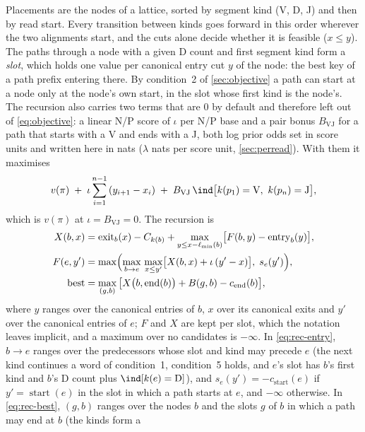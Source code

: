 \documentclass[11pt,a4paper]{article}
\begin{document}
Placements are the nodes of a lattice, sorted by segment kind (V, D, J) and
then by read start. Every transition between kinds goes forward in this
order wherever the two alignments start, and the cuts alone decide whether
it is feasible ($x\le y$). The paths through a node with a given D count and
first segment kind form a \emph{slot}, which holds one value per canonical
entry cut $y$ of the node: the best key of a path prefix entering there. By
condition~2 of \cref{sec:objective} a path can start at a node only at the
node's own start, in the slot whose first kind is the node's. The recursion
also carries two terms that are 0 by default and therefore left out of
\cref{eq:objective}: a linear N/P score of $\iota$ per N/P base and a pair
bonus $B_{\mathrm{VJ}}$ for a path that starts with a V and ends with a J,
both log prior odds set in score units and written here in nats ($\lambda$
nats per score unit, \cref{sec:perread}). With them it maximises
\begin{equation}
  v(\pi) \;+\; \iota\sum_{i=1}^{n-1}\,(y_{i+1}-x_i)
  \;+\; B_{\mathrm{VJ}}\,\ind\bigl[k(p_1)=\mathrm V,\ k(p_n)=\mathrm J\bigr],
  \label{eq:objective-ext}
\end{equation}
which is $v(\pi)$ at $\iota=B_{\mathrm{VJ}}=0$. The recursion is
\begin{align}
  X(b,x) &= \operatorname{exit}_b(x) - C_{k(b)} + \max_{y\le x-\ell_{\min}(b)}\bigl[F(b,y)-\operatorname{entry}_b(y)\bigr], \label{eq:rec-exit}\\
  F(e,y') &= \max\Bigl(\max_{b\to e}\,\max_{x\le y'} \bigl[X(b,x) + \iota\,(y'-x)\bigr],\; s_e(y')\Bigr), \label{eq:rec-entry}\\
  \text{best} &= \max_{(g,b)}\,\bigl[X\bigl(b,\operatorname{end}(b)\bigr) + B(g,b) - c_{\text{end}}(b)\bigr], \label{eq:rec-best}
\end{align}
where $y$ ranges over the canonical entries of $b$, $x$ over its canonical
exits and $y'$ over the canonical entries of $e$; $F$ and $X$ are kept per
slot, which the notation leaves implicit, and a maximum over no candidates is
$-\infty$. In \cref{eq:rec-entry}, $b\to e$ ranges over the predecessors
whose slot and kind may precede $e$ (the next kind continues a word of
condition~1, condition~5 holds, and $e$'s slot has $b$'s first kind and $b$'s
D count plus $\ind[k(e)=\mathrm D]$), and $s_e(y')=-c_{\text{start}}(e)$ if
$y'=\operatorname{start}(e)$ in the slot in which a path starts at $e$, and
$-\infty$ otherwise. In \cref{eq:rec-best}, $(g,b)$ ranges over the nodes $b$
and the slots $g$ of $b$ in which a path may end at $b$ (the kinds form a
\end{document}
